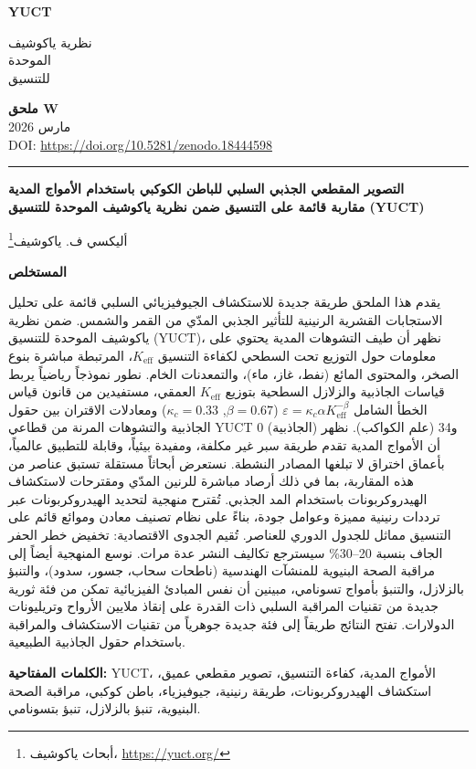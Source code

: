 \documentclass[12pt,a4paper]{article}
\newcommand{\Keff}{K_{\mathrm{eff}}}
\newcommand{\kappac}{\kappa_c}
\newcommand{\eps}{\varepsilon}
\theoremstyle{remark}
\newcommand{\makeheader}{%
	\noindent
	\begin{minipage}{0.17\textwidth}
		\raggedright
		{\sffamily\bfseries\color{skyblue}\fontsize{46}{46}\selectfont YUCT}%
	\end{minipage}%
	\hspace{30pt}
	\begin{minipage}{0.32\textwidth}
		\raggedright
		{\sffamily\fontsize{11}{13}\selectfont نظرية ياكوشيف\\ الموحدة\\ للتنسيق}%
	\end{minipage}%
	\hfill
	\begin{minipage}{0.38\textwidth}
		\raggedleft
		{\sffamily\bfseries ملحق W}\\
		{\sffamily مارس 2026}\\
		{\sffamily\footnotesize \scriptsize DOI: \url{https://doi.org/10.5281/zenodo.18444598}}%
	\end{minipage}
	\par\vspace{5pt}
	\noindent\textcolor{gold}{\rule{\textwidth}{1.6pt}}
	\par\vspace{0pt}
}
\begin{document}
	\thispagestyle{firstpage}
	\makeheader
	
	\vspace{0cm}
	{\LARGE\bfseries التصوير المقطعي الجذبي السلبي للباطن الكوكبي باستخدام الأمواج المدية \\
		\Large مقاربة قائمة على التنسيق ضمن نظرية ياكوشيف الموحدة للتنسيق (YUCT) \par}
	\vspace{0.2cm}
	
	{\large أليكسي ف. ياكوشيف\footnote{أبحاث ياكوشيف، \url{https://yuct.org/}}} \\
	\vspace{0.0cm}
	
	{\color{darkblue}\textbf{\LARGE المستخلص}} \par
	{\large
		\noindent
		يقدم هذا الملحق طريقة جديدة للاستكشاف الجيوفيزيائي السلبي قائمة على تحليل الاستجابات القشرية الرنينية للتأثير الجذبي المدّي من القمر والشمس. ضمن نظرية ياكوشيف الموحدة للتنسيق (YUCT)، نظهر أن طيف التشوهات المدية يحتوي على معلومات حول التوزيع تحت السطحي لكفاءة التنسيق \(\Keff\)، المرتبطة مباشرة بنوع الصخر، والمحتوى المائع (نفط، غاز، ماء)، والتمعدنات الخام. نطور نموذجاً رياضياً يربط قياسات الجاذبية والزلازل السطحية بتوزيع \(\Keff\) العمقي، مستفيدين من قانون قياس الخطأ الشامل \(\eps = \kappac \alpha \Keff^{-\beta}\) (\(\beta=0.67\), \(\kappac=0.33\)) ومعادلات الاقتران بين حقول الجاذبية والتشوهات المرنة من قطاعي YUCT 0 (الجاذبية) و34 (علم الكواكب). نظهر أن الأمواج المدية تقدم طريقة سبر غير مكلفة، ومفيدة بيئياً، وقابلة للتطبيق عالمياً، بأعماق اختراق لا تبلغها المصادر النشطة. نستعرض أبحاثاً مستقلة تستبق عناصر من هذه المقاربة، بما في ذلك أرصاد مباشرة للرنين المدّي ومقترحات لاستكشاف الهيدروكربونات باستخدام المد الجذبي. تُقترح منهجية لتحديد الهيدروكربونات عبر ترددات رنينية مميزة وعوامل جودة، بناءً على نظام تصنيف معادن وموائع قائم على التنسيق مماثل للجدول الدوري للعناصر. تُقيم الجدوى الاقتصادية: تخفيض خطر الحفر الجاف بنسبة 20–30\% سيسترجع تكاليف النشر عدة مرات. نوسع المنهجية أيضاً إلى مراقبة الصحة البنيوية للمنشآت الهندسية (ناطحات سحاب، جسور، سدود)، والتنبؤ بالزلازل، والتنبؤ بأمواج تسونامي، مبينين أن نفس المبادئ الفيزيائية تمكن من فئة ثورية جديدة من تقنيات المراقبة السلبي ذات القدرة على إنقاذ ملايين الأرواح وتريليونات الدولارات. تفتح النتائج طريقاً إلى فئة جديدة جوهرياً من تقنيات الاستكشاف والمراقبة باستخدام حقول الجاذبية الطبيعية.
	}
	
	\vspace{0.1cm}
	\noindent
	{\color{darkblue}\textbf{الكلمات المفتاحية:}} YUCT، الأمواج المدية، كفاءة التنسيق، تصوير مقطعي عميق، استكشاف الهيدروكربونات، طريقة رنينية، جيوفيزياء، باطن كوكبي، مراقبة الصحة البنيوية، تنبؤ بالزلازل، تنبؤ بتسونامي.
	
\end{document}
